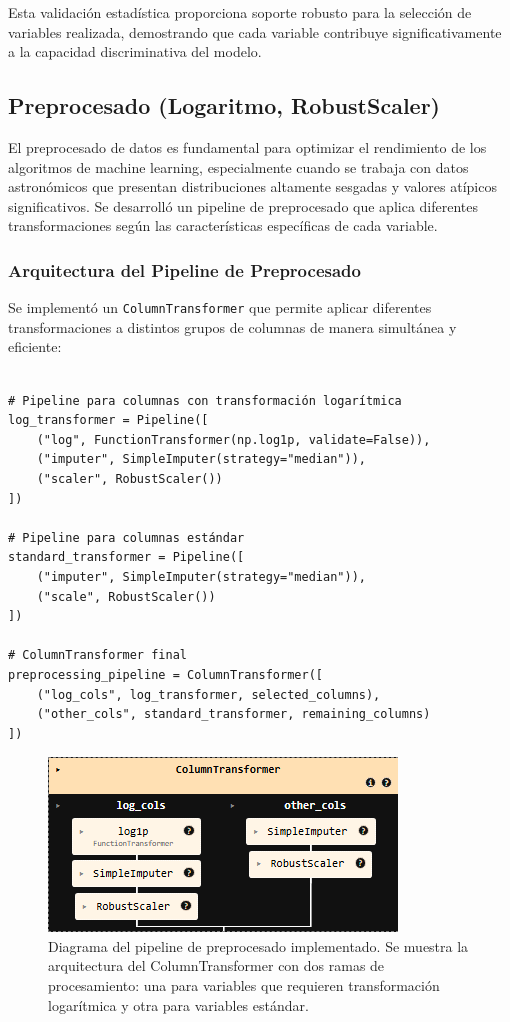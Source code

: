 \documentclass{article}
\begin{document}
Esta validación estadística proporciona soporte robusto para la selección de variables realizada, demostrando que cada variable contribuye significativamente a la capacidad discriminativa del modelo.

\subsection{Preprocesado (Logaritmo, RobustScaler)}

El preprocesado de datos es fundamental para optimizar el rendimiento de los algoritmos de machine learning, especialmente cuando se trabaja con datos astronómicos que presentan distribuciones altamente sesgadas y valores atípicos significativos. Se desarrolló un pipeline de preprocesado que aplica diferentes transformaciones según las características específicas de cada variable.

\subsubsection{Arquitectura del Pipeline de Preprocesado}

Se implementó un \texttt{ColumnTransformer} que permite aplicar diferentes transformaciones a distintos grupos de columnas de manera simultánea y eficiente:

\begin{verbatim}

# Pipeline para columnas con transformación logarítmica
log_transformer = Pipeline([
    ("log", FunctionTransformer(np.log1p, validate=False)),
    ("imputer", SimpleImputer(strategy="median")),
    ("scaler", RobustScaler())
])

# Pipeline para columnas estándar
standard_transformer = Pipeline([
    ("imputer", SimpleImputer(strategy="median")),
    ("scale", RobustScaler())
])

# ColumnTransformer final
preprocessing_pipeline = ColumnTransformer([
    ("log_cols", log_transformer, selected_columns),
    ("other_cols", standard_transformer, remaining_columns)
])
\end{verbatim}

\begin{figure}[H]
    \centering
    \includegraphics[width=0.6\linewidth]{preprocesado_pipeline.png}
    \caption{Diagrama del pipeline de preprocesado implementado. Se muestra la arquitectura del ColumnTransformer con dos ramas de procesamiento: una para variables que requieren transformación logarítmica y otra para variables estándar.}
    \label{fig:pipeline_preprocesado}
\end{figure}
\end{document}
